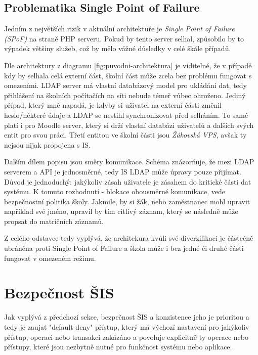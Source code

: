 \documentclass[FM,Proj]{tulthesis}
\begin{document}
\subsection*{Problematika Single Point of Failure}
\label{section:problematika-single-point-of-failure}

Jedním z největších rizik v aktuální architektuře je \textit{Single Point of Failure (SPoF)} na straně PHP serveru. 
Pokud by tento server selhal, způsobilo by to výpadek většiny služeb, což by mělo vážné důsledky v celé škále případů. 

Dle architektury z diagramu \ref{fig:puvodni-architektura} je viditelné, že v případě kdy by selhala celá externí část,
školní část může zcela bez problému fungovat s omezeními. LDAP server má vlastní databázový model pro ukládání dat, tedy
přihlášení na školních počítačích na síti nebude témeř vůbec ohroženo. Jediný případ, který mně napadá, je kdyby si uživatel
na externí části změnil heslo/některé údaje a LDAP se nestihl synchronizovat před selháním. To samé platí i pro Moodle
server, který si drží vlastní databázi uživatelů a dalších svých entit pro svou práci.
Třetí entitou ve školní části jsou \textit{Žákovská VPS}, avšak ty nejsou nijak propojena s IS.

Dalším dílem popisu jsou směry komunikace. Schéma znázorňuje, že mezi LDAP serverem a API je jednosměrné, tedy IS
LDAP může úpravy pouze přijímat. Důvod je jednoduchý: jakýkoliv zásah uživatele je zásahem do kritické části 
dat systému. K tomuto rozhodnutí - blokace obousměrné komunikace, vede bezpečnostní politika školy. Jakmile,
by si žák, nebo zaměstnanec mohl upravit například své jméno, upravil by tím citlivý záznam, který se následně
může propsat do matričních záznamů.

Z celého odstavce tedy vyplývá, že architekura kvůli své diverzifikaci je částečně ubráněna proti Single Point of Failure
a škola může i bez jedné či druhé části fungovat v omezeném režimu.

\section{Bezpečnost ŠIS}
\label{section:bezpecnost-sis}
Jak vyplývá z předchozí sekce, bezpečnost ŠIS a konzistence jeho je prioritou a tedy je
zaujat "default-deny" přístup, který má výchozí nastavení pro jakýkoliv přístup, operaci
nebo transakci zakázáno a povoluje explicitně ty operace nebo přístupy, které jsou
nezbytně nutné pro funkčnost systému nebo aplikace.
\end{document}
